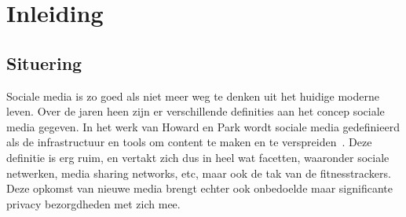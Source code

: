 
\chapter{Inleiding}

\section{Situering}
Sociale media is zo goed als niet meer weg te denken uit het huidige moderne
leven. Over de jaren heen zijn er verschillende definities aan het concep
sociale media gegeven. In het werk van Howard en Park wordt sociale media
gedefinieerd als de infrastructuur en tools om content te maken en te
verspreiden~\cite{PhilipsAndParks}. Deze definitie is erg ruim, en vertakt zich
dus in heel wat facetten, waaronder sociale netwerken, media sharing networks,
etc, maar ook de tak van de fitnesstrackers. Deze opkomst van nieuwe media
brengt echter ook onbedoelde maar significante privacy bezorgdheden met zich
mee.

